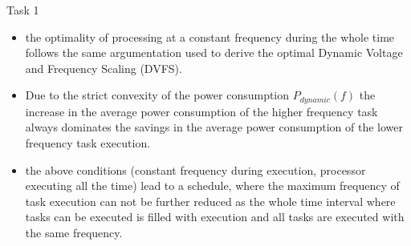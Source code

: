 \begin{frame}[allowframebreaks]{Task 1}{}
\begin{solutionnoinc}
\begin{itemize}
        \begin{itemize}
          \item determine right frequency by looking at schedule: $\frac{9}{12} = 0.75$
          \item determine right frequency by calculation:
            \begin{itemize}
              \item $1 = \frac{\frac{2 kCycles}{f}}{6ms} + \frac{\frac{1 kCycles}{f}}{4ms}  + \frac{\frac{2 kCycles}{f}}{12ms} = \frac{\frac{4 kCycles + 3 kCycles + 2 kCycles}{f}}{12ms} \Leftrightarrow f = \frac{9 \cdot 10^3 Cycles}{12 \cdot 10^{-3} s} = 0.75 \cdot 10^{3 + 3} \cdot \frac{1}{s}  = 0.75MHz$
            \end{itemize}
        \end{itemize}
      \item the optimality of processing at a constant frequency during the whole time follows the same argumentation used to derive the optimal Dynamic Voltage and Frequency Scaling (DVFS).
    \end{itemize}
  \end{solutionnoinc}
  \begin{solutionnoinc}
    \small
    \begin{itemize}
      \item Due to the strict convexity of the power consumption $P_{dynamic}(f)$ the increase in the average power consumption of the higher frequency task always dominates the savings in the average power consumption of the lower frequency task execution.
      \item the above conditions (constant frequency during execution, processor executing all the time) lead to a schedule, where the maximum frequency of task execution can not be further reduced as the whole time interval where tasks can be executed is filled with execution and all tasks are executed with the same frequency.
    \end{itemize}
  \end{solutionnoinc}
\end{frame}
